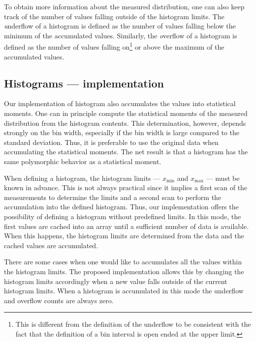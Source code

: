 To obtain more information about the measured distribution, one
can also keep track of the number of values falling outside of the
histogram limits.
The {\textsl underflow} of a histogram is defined as the number of values
falling below the minimum  of the accumulated values.
Similarly, the {\textsl overflow} of a histogram is defined as the number of
values falling on\footnote{This is different from the definition of the
  underflow to be consistent with the fact that the definition of a bin interval
  is open ended at the upper limit.} or above the maximum of the accumulated values.

\subsection{Histograms --- implementation}
Our implementation of histogram also accumulates the values into statistical
moments.
One can in principle compute the statistical moments of the measured
distribution from the histogram contents.
This determination, however, depends strongly on the bin width, especially if
the bin width is large compared to the standard deviation.
Thus, it is preferable to use the original data when accumulating the
statistical moments.
The net result is that a histogram has the same polymorphic behavior as a statistical moment.

When defining a histogram, the histogram limits --- $x_{\min}$ and
$x_{\max}$ --- must be known in advance.
This is not always practical since it implies a first scan of the measurements to
determine the limits and a second scan to perform the accumulation
into the defined histogram. Thus, our implementation offers the
possibility of defining a histogram without predefined limits. In
this mode, the first values are cached into an array until a
sufficient number of data is available. When this happens, the
histogram limits are determined from the data and the cached
values are accumulated.

There are some cases when one would like to accumulates all the
values within the histogram limits. The proposed implementation
allows this by changing the histogram limits accordingly when a
new value falls outside of the current histogram limits. When a
histogram is accumulated in this mode the underflow and overflow
counts are always zero.

